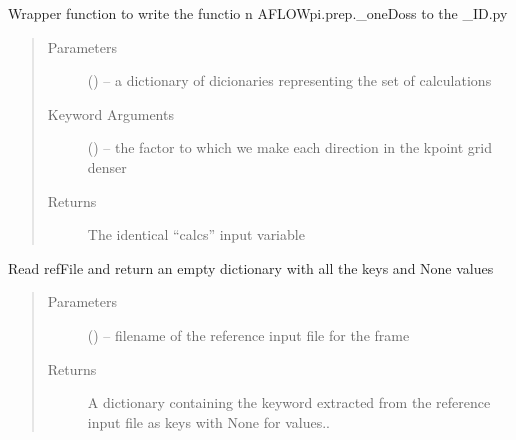 \documentclass[letterpaper,10pt,english]{sphinxmanual}
\begin{document}
\begin{fulllineitems}
\label{\detokenize{prep:prep.doss}}
Wrapper function to write the functio n AFLOWpi.prep.\_oneDoss to the \_ID.py
\begin{quote}\begin{description}
\item[{Parameters}] \leavevmode
{} () -- a dictionary of dicionaries representing the set of calculations

\item[{Keyword Arguments}] \leavevmode
{} () -- the factor to which we make each direction in the kpoint grid denser

\item[{Returns}] \leavevmode
The identical ``calcs'' input variable

\end{description}\end{quote}

\end{fulllineitems}


\begin{fulllineitems}
\label{\detokenize{prep:prep.extractvars}}
Read refFile and return an empty dictionary with all the keys and None values
\begin{quote}\begin{description}
\item[{Parameters}] \leavevmode
{} () -- filename of the reference input file for the frame

\item[{Returns}] \leavevmode
A dictionary containing the keyword extracted from the reference input file
as keys with None for values..

\end{description}\end{quote}

\end{fulllineitems}

\end{document}
